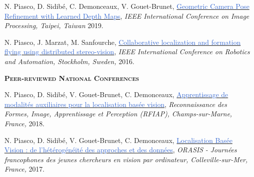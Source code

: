 \documentclass[]{friggeri-cv-cust}
\begin{document}
    {\footnotesize{N. Piasco, D. Sidibé,  C. Demonceaux, V. Gouet-Brunet, \href{https://hal.archives-ouvertes.fr/hal-02123899}{\textcolor{highlight}{Geometric Camera Pose Refinement with Learned Depth Maps}},
\textit{IEEE International Conference on Image Processing, Taipei, Taiwan} 2019.}}

	{\footnotesize{N. Piasco, J. Marzat, M. Sanfourche, \href{http://julien.marzat.free.fr/Publications/2016\%20ICRA/2016_ICRA_Collaborative_localization_formation_flying_distributed_stereo-vision.pdf}{\textcolor{highlight}{Collaborative localization and formation ﬂying using distributed stereo-vision}},
\textit{IEEE International Conference on Robotics and Automation, Stockholm, Sweden,} 2016.}}	

	\vspace{0.5cm}
    \textsc{\textbf{Peer-reviewed National Conferences}}
    
    {\footnotesize{N. Piasco, D. Sidibé, V. Gouet-Brunet, C. Demonceaux, \href{https://rfiap2018.ign.fr/sites/default/files/ARTICLES/RFIAP_2018/RFIAP_2018_Piasco_Apprentissage.pdf}{\textcolor{highlight}{Apprentissage de modalités auxiliaires pour la localisation basée vision}},
\textit{Reconnaissance des Formes, Image, Apprentissage et Perception (RFIAP), Champs-sur-Marne, France,} 2018.}}

\footnotesize{N. Piasco, D. Sidibé, V. Gouet-Brunet, C. Demonceaux, \href{http://recherche.ign.fr/labos/matis/img/ic_pdf.gif}{\textcolor{highlight}{Localisation Basée Vision : de l’hétérogénéité des approches et des données}},
\textit{ORASIS - Journées francophones des jeunes chercheurs en vision par ordinateur, Colleville-sur-Mer, France,} 2017.}
    


% 
\end{document}
